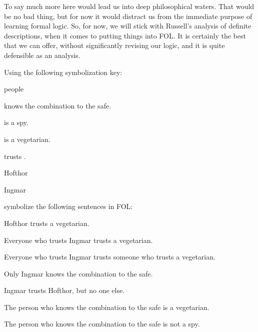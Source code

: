 To say much more here would lead us into deep philosophical waters. That would be no bad thing, but for now it would distract us from the immediate purpose of learning formal logic. So, for now, we will stick with Russell's analysis of definite descriptions, when it comes to putting things into FOL. It is certainly the best that we can offer, without significantly revising our logic, and it is quite defensible as an analysis.

\begin{practiceproblems}

\problempart
Using the following symbolization key:
\begin{ekey}
\item[\text{domain}] people
\item[Kx]  knows the combination to the safe.
\item[Sx]  is a spy.
\item[Vx]  is a vegetarian.
\item[Txy]  trusts .
\item[h] Hofthor
\item[i] Ingmar
\end{ekey}
symbolize the following sentences in FOL:
\begin{problemslist}
\item Hofthor trusts a vegetarian.
\item Everyone who trusts Ingmar trusts a vegetarian.
\item Everyone who trusts Ingmar trusts someone who trusts a vegetarian.
\item Only Ingmar knows the combination to the safe.
\item Ingmar trusts Hofthor, but no one else.
\item The person who knows the combination to the safe is a vegetarian.
\item The person who knows the combination to the safe is not a spy.
\end{problemslist}



\end{practiceproblems}

